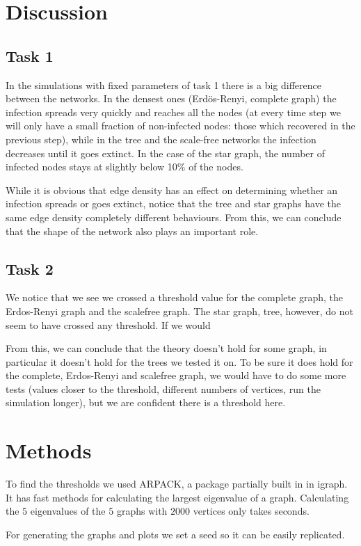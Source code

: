 \documentclass[paper=a4, fontsize=11pt]{scrartcl} %
\begin{document}
\section{Discussion}
\subsection{Task 1}
In the simulations with fixed parameters of task 1 there is a big difference between the networks. In the densest ones (Erdös-Renyi, complete graph) the infection spreads very quickly and reaches all the nodes (at every time step we will only have a small fraction of non-infected nodes: those which recovered in the previous step), while in the tree and the scale-free networks the infection decreases until it goes extinct. In the case of the star graph, the number of infected nodes stays at slightly below 10\% of the nodes.

While it is obvious that edge density has an effect on determining whether an infection spreads or goes extinct, notice that the tree and star graphs have the same edge density completely different behaviours. From this, we can conclude that the shape of the network also plays an important role.

\subsection{Task 2}
We notice that we see we crossed a threshold value for the complete graph, the Erdos-Renyi graph and the scalefree graph. The star graph, tree, however, do not seem to have crossed any threshold. If we would 

From this, we can conclude that the theory doesn't hold for some graph, in particular it doesn't hold for the trees we tested it on. To be sure it does hold for the complete, Erdos-Renyi and scalefree graph, we would have to do some more tests (values closer to the threshold, different numbers of vertices, run the simulation longer), but we are confident there is a threshold here.

\section{Methods}
To find the thresholds we used ARPACK, a package partially built in in igraph. It has fast methods for calculating the largest eigenvalue of a graph. Calculating the $5$ eigenvalues of the $5$ graphs with $2000$ vertices only takes seconds.

For generating the graphs and plots we set a seed so it can be easily replicated.
\end{document}
